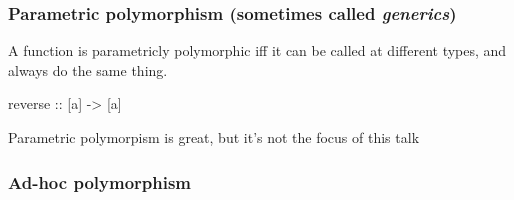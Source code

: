 \documentclass[usenames,dvipsnames,svgnames,table,aspectratio=169,mathserif]{beamer}
\begin{document}
\begin{frame}[fragile]

\frametitle{Parametric polymorphism (sometimes called {\it generics})}

A function is parametricly polymorphic iff it can be called at different types,
and always do the same thing.

\begin{code}
reverse :: [a] -> [a]
\end{code}

\pause

Parametric polymorpism is great, but it's not the focus of this talk

\end{frame}


\begin{frame}
\frametitle{Ad-hoc polymorphism}



\end{frame}
\end{document}
